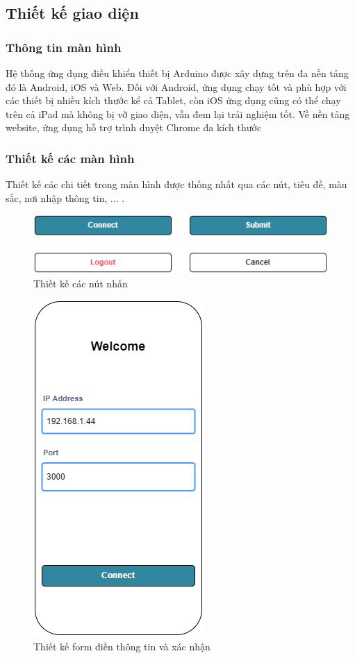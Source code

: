 \documentclass[../DoAn.tex]{subfiles}
\begin{document}
\subsection{Thiết kế giao diện}

\subsubsection{Thông tin màn hình}

Hệ thống ứng dụng điều khiển thiết bị Arduino được xây dựng trên đa nền tảng đó là Android, iOS và Web. Đối với Android, ứng dụng chạy tốt và phù hợp với các thiết bị nhiều kích thước kể cả Tablet, còn iOS ứng dụng cũng có thể chạy trên cả iPad mà không bị vỡ giao diện, vẫn đem lại trải nghiệm tốt. Về nền tảng website, ứng dụng hỗ trợ trình duyệt Chrome đa kích thước

\subsubsection{Thiết kế các màn hình}

Thiết kế các chi tiết trong màn hình được thống nhất qua các nút, tiêu đề, màu sắc, nơi nhập thông tin, ... .

\begin{figure}[H]
    \centering
    \includegraphics[scale = 0.75]{Hinhve/button.png}
    \caption{Thiết kế các nút nhấn}
    \label{fig:Fig4}
\end{figure}

\begin{figure}[H]
    \centering
    \includegraphics[scale = 0.75]{Hinhve/form.png}
    \caption{Thiết kế form điền thông tin và xác nhận}
    \label{fig:Fig5}
\end{figure}
\end{document}
